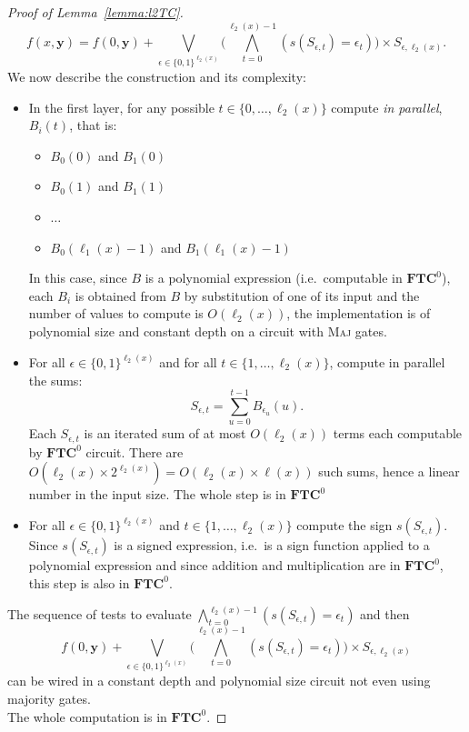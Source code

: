\documentclass[11pt, oneside]{article}
\newenvironment{toappendix}{}{}
\newcommand{\TC}{\mathbf{FTC}}
\newcommand{\tu}[1]{\mathbf{#1}}
\theoremstyle{definition}
\begin{document}
\begin{toappendix}
\begin{proof}[Proof of Lemma~\ref{lemma:l2TC}]
        $$
            f(x, \tu y) = f(0, \tu y) + \bigvee_{\epsilon \in \{0,1\}^{\ell_2(x)}}\bigg(\bigwedge^{\ell_2(x)-1}_{t=0} (s(S_{\epsilon,t})=\epsilon_t)\bigg) \times S_{\epsilon, \ell_2(x)}.
        $$
        We now describe the construction and its complexity:
        \begin{itemize}
            \itemsep0em
            \item In the first layer, for any possible $t\in \{0, \dots, \ell_2(x)\}$ compute \emph{in parallel}, $B_i(t)$, that is:
            \begin{itemize}
                \itemsep0em
                \item $B_0(0)$ and $B_1(0)$
                \item $B_0(1)$ and $B_1(1)$
                \item $\dots$
                \item $B_0(\ell_1(x)-1)$ and $B_1(\ell_1(x)-1)$
            \end{itemize}
            In this case, since $B$ is a polynomial expression (i.e.~computable in $\TC^0$), each $B_i$ is obtained from $B$ by substitution of one of its input and the number of values to compute is $O(\ell_2(x))$, the implementation is of polynomial size and constant depth on a  circuit with \textsc{Maj} gates.
            \item For all $\epsilon \in \{0,1\}^{\ell_2(x)}$ and for all $t\in \{1,\dots, \ell_2(x)\}$, compute in parallel the sums:
            $$
                S_{\epsilon, t} = \sum^{t-1}_{u=0} B_{\epsilon_u}(u).
            $$
            Each $S_{\epsilon,t}$ is an iterated sum of at most $O(\ell_2(x))$ terms each computable by $\TC^0$ circuit.
            There are $O(\ell_2(x) \times 2^{\ell_2(x)})=O(\ell_2(x)\times \ell(x))$ such sums, hence a linear number in the input size.
            The whole step is in $\TC^0$
            \item For all $\epsilon \in \{0,1\}^{\ell_2(x)}$ and $t\in \{1,\dots, \ell_2(x)\}$ compute the sign $s(S_{\epsilon, t})$. 
            Since $s(S_{\epsilon,t})$ is a signed expression, i.e.~is a sign function applied to a polynomial expression and since addition and multiplication are in $\TC^0$, this step is also in $\TC^0$. 
        \end{itemize}
        The sequence of tests to evaluate $\bigwedge^{\ell_2(x)-1}_{t=0} (s(S_{\epsilon, t})=\epsilon_t)$ and then
        $$
            f(0, \tu y) + \bigvee_{\epsilon \in \{0,1\}^{\ell_2(x)}} \bigg(\bigwedge^{\ell_2(x)-1}_{t=0} (s(S_{\epsilon, t})=\epsilon_t)\bigg) \times S_{\epsilon, \ell_2(x)}
        $$
        can be wired in a constant depth and polynomial size circuit not even using majority gates.
        \\
        The whole computation is in $\TC^0$.
    \end{proof}
\end{toappendix}
\end{document}
